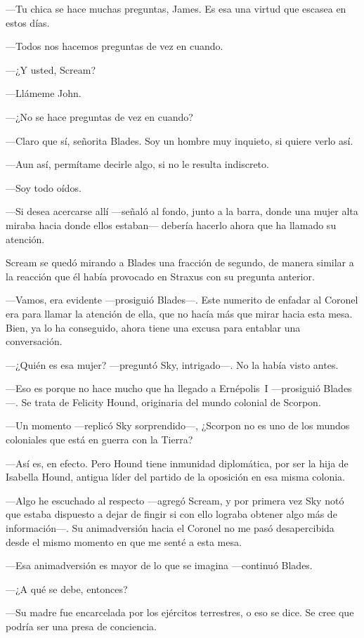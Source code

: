 ---Tu chica se hace muchas preguntas, James. Es esa una virtud que escasea en estos días.

---Todos nos hacemos preguntas de vez en cuando.

---¿Y usted, Scream?

---Llámeme John.

---¿No se hace preguntas de vez en cuando?

---Claro que sí, señorita Blades. Soy un hombre muy inquieto, si quiere verlo así.

---Aun así, permítame decirle algo, si no le resulta indiscreto.

---Soy todo oídos.

---Si desea acercarse allí ---señaló al fondo, junto a la barra, donde una mujer alta miraba hacia donde ellos estaban--- debería hacerlo ahora que ha llamado su atención.

Scream se quedó mirando a Blades una fracción de segundo, de manera similar a la reacción que él había provocado en Straxus con su pregunta anterior.

---Vamos, era evidente ---prosiguió Blades---. Este numerito de enfadar al Coronel era para llamar la atención de ella, que no hacía más que mirar hacia esta mesa. Bien, ya lo ha conseguido, ahora tiene una excusa para entablar una conversación.

---¿Quién es esa mujer? ---preguntó Sky, intrigado---. No la había visto antes.

---Eso es porque no hace mucho que ha llegado a Ernépolis~I ---prosiguió Blades---. Se trata de Felicity Hound, originaria del mundo colonial de Scorpon.

---Un momento ---replicó Sky sorprendido---, ¿Scorpon no es uno de los mundos coloniales que está en guerra con la Tierra?

---Así es, en efecto. Pero Hound tiene inmunidad diplomática, por ser la hija de Isabella Hound, antigua líder del partido de la oposición en esa misma colonia.

---Algo he escuchado al respecto ---agregó Scream, y por primera vez Sky notó que estaba dispuesto a dejar de fingir si con ello lograba obtener algo más de información---. Su animadversión hacia el Coronel no me pasó desapercibida desde el mismo momento en que me senté a esta mesa.

---Esa animadversión es mayor de lo que se imagina ---continuó Blades.

---¿A qué se debe, entonces?

---Su madre fue encarcelada por los ejércitos terrestres, o eso se dice. Se cree que podría ser una presa de conciencia.


